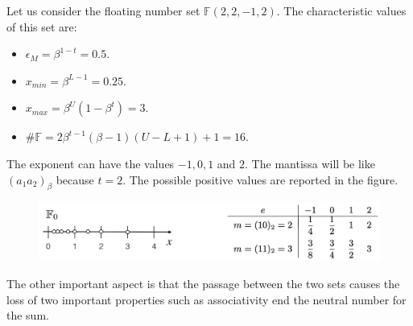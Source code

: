 \documentclass[12pt, a4paper]{report}
\newtheorem[style=M,bodystyle=\normalfont]{theorem}{Theorem}
\newtheorem[style=M,bodystyle=\normalfont]{corollary}{Corollary}
\newtheorem[style=M,bodystyle=\normalfont]{lemma}{Lemma}
\newtheorem[style=M,bodystyle=\normalfont]{definition}{Definition}
\begin{document}
\begin{example}
    Let us consider the floating number set $\mathbb{F}(2,2,-1,2)$. The characteristic values of this set are: 
    \begin{itemize}
        \item $\epsilon_M=\beta^{1-t}=0.5$.
        \item $x_{min}=\beta^{L-1}=0.25$.
        \item $x_{max}=\beta^U(1-\beta^t)=3$.
        \item $\#\mathbb{F}=2 \beta^{t-1}(\beta -1)(U-L+1)+1=16$. 
    \end{itemize}
    The exponent can have the values $-1,0,1$ and $2$. The mantissa will be like $(a_1a_2)_{\beta}$ because $t=2$. The possible positive values are
    reported in the figure. 
    \begin{figure}[H]
        \centering
        \includegraphics[width=0.9\linewidth]{images/numbers.png}
    \end{figure}
\end{example}
The other important aspect is that the passage between the two sets causes the loss of two important properties such as associativity end the 
neutral number for the sum. 
\end{document}
